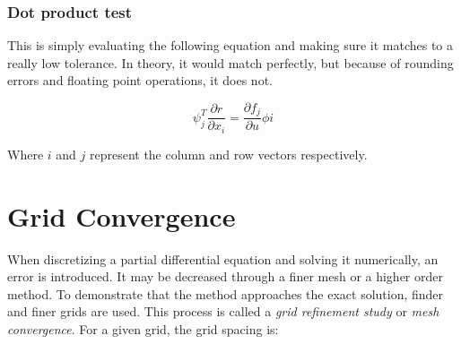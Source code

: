 \subsubsection{Dot product test}
This is simply evaluating the following equation and making sure it matches to
a really low tolerance. In theory, it would match perfectly, but because of
rounding errors and floating point operations, it does not.

\begin{equation}
    \psi_j^T \frac{\partial r}{\partial x_i} = 
    \frac{\partial f_j}{\partial u} \phi i
\end{equation}

\noindent Where $i$ and $j$ represent the column and row vectors respectively.
\cite{mdobook}











 






\section{Grid Convergence}
When discretizing a partial differential equation and solving it numerically,
an error is introduced. It may be decreased through a finer mesh or a higher
order method. To demonstrate that the method approaches the exact solution,
finder and finer grids are used. This process is called a \textit{grid
refinement study} or \textit{mesh convergence}. For a given grid, the grid
spacing is:

